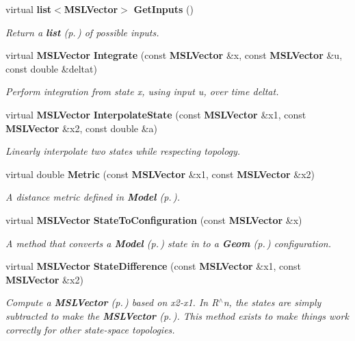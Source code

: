 \begin{CompactItemize}
virtual {\bf list}$<${\bf MSLVector}$>$ {\bf Get\-Inputs} ()
\begin{CompactList}\small\item\em Return a {\bf list} {\rm (p.\,\pageref{classlist})} of possible inputs.\item\end{CompactList}\item 
virtual {\bf MSLVector} {\bf Integrate} (const {\bf MSLVector} \&x, const {\bf MSLVector} \&u, const double \&deltat)
\begin{CompactList}\small\item\em Perform integration from state x, using input u, over time deltat.\item\end{CompactList}\item 
virtual {\bf MSLVector} {\bf Interpolate\-State} (const {\bf MSLVector} \&x1, const {\bf MSLVector} \&x2, const double \&a)
\begin{CompactList}\small\item\em Linearly interpolate two states while respecting topology.\item\end{CompactList}\item 
virtual double {\bf Metric} (const {\bf MSLVector} \&x1, const {\bf MSLVector} \&x2)
\begin{CompactList}\small\item\em A distance metric defined in {\bf Model} {\rm (p.\,\pageref{classModel})}.\item\end{CompactList}\item 
virtual {\bf MSLVector} {\bf State\-To\-Configuration} (const {\bf MSLVector} \&x)
\begin{CompactList}\small\item\em A method that converts a {\bf Model} {\rm (p.\,\pageref{classModel})} state in to a {\bf Geom} {\rm (p.\,\pageref{classGeom})} configuration.\item\end{CompactList}\item 
virtual {\bf MSLVector} {\bf State\-Difference} (const {\bf MSLVector} \&x1, const {\bf MSLVector} \&x2)
\begin{CompactList}\small\item\em Compute a {\bf MSLVector} {\rm (p.\,\pageref{classMSLVector})} based on x2-x1. In R$^\wedge$n, the states are simply subtracted to make the {\bf MSLVector} {\rm (p.\,\pageref{classMSLVector})}. This method exists to make things work correctly for other state-space topologies.\item\end{CompactList}\item 

\end{CompactItemize}
